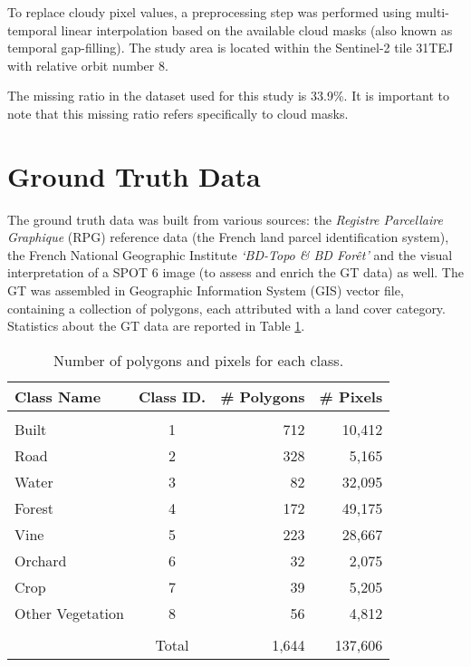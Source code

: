 
To replace cloudy pixel values, a preprocessing step was performed using multi-temporal linear interpolation based on the available cloud masks (also known as temporal gap-filling\cite{IENCO201911}).
The study area is located within the Sentinel-2 tile 31TEJ with relative orbit number 8.

The missing ratio in the dataset used for this study is 33.9\%. It is important to note that this missing ratio refers specifically to cloud masks.

\section{Ground Truth Data}

The ground truth data was built from various sources: the \textit{Registre Parcellaire Graphique} (RPG) reference data (the French land parcel identification system), the French National Geographic Institute \textit{‘BD-Topo \& BD Forêt’} and the visual interpretation of a SPOT 6 image (to assess and enrich the GT data) as well. 
The GT was assembled in Geographic Information System (GIS) vector file, containing a collection of polygons, each attributed with a land cover category. 
Statistics about the GT data are reported in Table \ref{tab:gt}.

\begin{table}[H]
\centering
\begin{tabular}{lcrr}
  Class Name & Class ID. & \# Polygons & \# Pixels \\[0.2cm]\hline \\[-0.2cm] 
  Built & 1 & 712 & 10,412\\
  Road  & 2 & 328 & 5,165\\
  Water & 3 & 82 & 32,095\\
  Forest  & 4 & 172 & 49,175\\
  Vine  & 5 & 223 & 28,667\\
  Orchard & 6 & 32 & 2,075\\
  Crop  & 7 & 39 & 5,205\\
  Other Vegetation & 8  & 56 & 4,812 \\[0.2cm]\hline \\[-0.2cm] 
  & Total & 1,644 & 137,606
\end{tabular}
\caption{Number of polygons and pixels for each class.}
\label{tab:gt}
\end{table}


